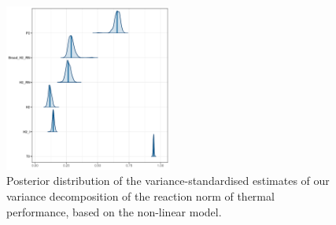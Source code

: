 \documentclass[a4paper,12pt,twoside]{article}
\begin{document}
\begin{figure}[b!]
  \includegraphics[width = 0.49\textwidth]{TPC_varstd_ds.pdf}
  \caption{Posterior distribution of the variance-standardised estimates of our variance decomposition of the reaction norm of thermal performance, based on the non-linear model.}
  \label{fig_tpc_nl_var_decomp_ds}
\end{figure}
\end{document}
